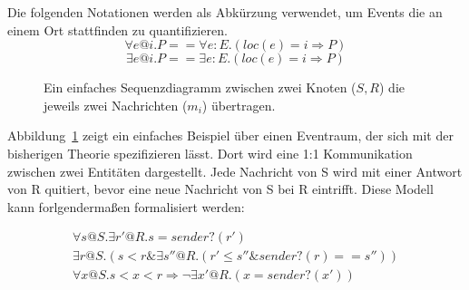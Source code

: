 \begin{defi}
  Die folgenden Notationen werden als Abkürzung verwendet, um Events die an einem
  Ort stattfinden zu quantifizieren.
  \[
    \forall e@i.P == \forall e:E.(loc(e) = i\Rightarrow P)
  \]
  \[
    \exists e@i.P == \exists e:E.(loc(e) = i\Rightarrow P)
  \]
\end{defi}

\begin{figure}
  \center
  \label{fig:sequence}
  \caption{Ein einfaches Sequenzdiagramm zwischen zwei Knoten ($S,R$) die jeweils
    zwei Nachrichten ($m_i$) übertragen.}
\end{figure}

Abbildung~\ref{fig:sequence} zeigt ein einfaches Beispiel über einen Eventraum,
der sich mit der bisherigen Theorie spezifizieren lässt. Dort wird eine 1:1
Kommunikation zwischen zwei Entitäten dargestellt. Jede Nachricht von S wird mit
einer Antwort von R quitiert, bevor eine neue Nachricht von S bei R eintrifft.
Diese Modell kann forlgendermaßen formalisiert werden:~\cite{bickford2005causal}

\begin{gather*}
  \forall s@S.\exists r'@R.s=sender?(r')\\
  \exists r@S.(s<r\&\exists s''@R.(r'\leq s''\& sender?(r) == s''))\\
  \forall x@S.s<x<r\Rightarrow \neg\exists x'@R.(x=sender?(x'))
\end{gather*}

